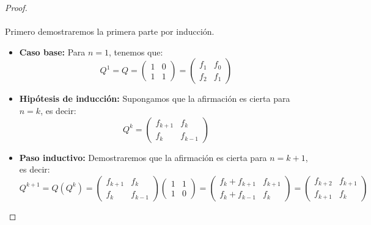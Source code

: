 \documentclass[11pt,letterpaper]{article}
\begin{document}
\begin{proof}\,\\
    \,\\
    Primero demostraremos la primera parte por inducci\'on.
    \begin{itemize}
        \item \textbf{Caso base:} Para $n=1$, tenemos que:
        \begin{equation*}
            Q^1=Q=\begin{pmatrix}
                1&0\\
                1&1
            \end{pmatrix}=\begin{pmatrix}
                f_1&f_0\\
                f_2&f_1
            \end{pmatrix}
        \end{equation*}
        \item \textbf{Hip\'otesis de inducci\'on:} Supongamos que la afirmaci\'on es cierta para $n=k$, es decir:
        \begin{equation*}
            Q^k=\begin{pmatrix}
                f_{k+1}&f_{k}\\
                f_{k}&f_{k-1}
            \end{pmatrix}
        \end{equation*}
        \item \textbf{Paso inductivo:} Demostraremos que la afirmaci\'on es cierta para $n=k+1$, es decir:
        \begin{equation*}
            Q^{k+1}=Q(Q^k)=\begin{pmatrix}
                f_{k+1}&f_{k}\\
                f_{k}&f_{k-1}
            \end{pmatrix}
            \begin{pmatrix}
                1&1\\
                1&0
            \end{pmatrix}=\begin{pmatrix}
                f_k+f_{k+1}&f_{k+1}\\
                f_{k}+f_{k-1}&f_k
            \end{pmatrix}=\begin{pmatrix}
                f_{k+2}&f_{k+1}\\
                f_{k+1}&f_k
            \end{pmatrix}
        \end{equation*}

\end{itemize}
\end{proof}
\end{document}
